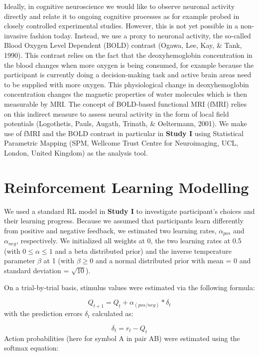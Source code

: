 \documentclass[12pt,openany]{book}
\theoremstyle{definition}
\theoremstyle{definition}
\theoremstyle{definition}
\theoremstyle{remark}
\begin{document}
Ideally, in cognitive neuroscience we would like to observe neuronal
activity directly and relate it to ongoing cognitive processes as for
example probed in closely controlled experimental studies. However, this
is not yet possible in a non-invasive fashion today. Instead, we use a
proxy to neuronal activity, the so-called Blood Oxygen Level Dependent
(BOLD) contrast (Ogawa, Lee, Kay, \& Tank, 1990). This contrast relies
on the fact that the deoxyhemoglobin concentration in the blood changes
when more oxygen is being consumed, for example because the participant
is currently doing a decision-making task and active brain areas need to
be supplied with more oxygen. This physiological change in
deoxyhemoglobin concentration changes the magnetic properties of water
molecules which is then measurable by MRI. The concept of BOLD-based
functional MRI (fMRI) relies on this indirect measure to assess neural
activity in the form of local field potentials (Logothetis, Pauls,
Augath, Trinath, \& Oeltermann, 2001). We make use of fMRI and the BOLD
contrast in particular in \textbf{Study I} using Statistical Parametric
Mapping (SPM, Wellcome Trust Centre for Neuroimaging, UCL, London,
United Kingdom) as the analysis tool.

\section{Reinforcement Learning
Modelling}\label{reinforcement-learning-modelling-1}

We used a standard RL model in \textbf{Study I} to investigate
participant's choices and their learning progress. Because we assumed
that participants learn differently from positive and negative feedback,
we estimated two learning rates, \(\alpha_{pos}\) and \(\alpha_{neg}\),
respectively. We initialized all weights at 0, the two learning rates at
0.5 (with \(0 \leq \alpha \leq 1\) and a beta distributed prior) and the
inverse temperature parameter \(\beta\) at 1 (with \(\beta \geq 0\) and
a normal distributed prior with mean = 0 and standard deviation =
\(\sqrt{10}\)).

On a trial-by-trial basis, stimulus values were estimated via the
following formula:

\[Q_{t+1} = Q_t + \alpha_{(pos/neg)} * \delta_t\] with the prediction
errors \(\delta_t\) calculated as:

\[\delta_t = r_t - Q_t\] Action probabilities (here for symbol A in pair
AB) were estimated using the softmax equation:
\end{document}

